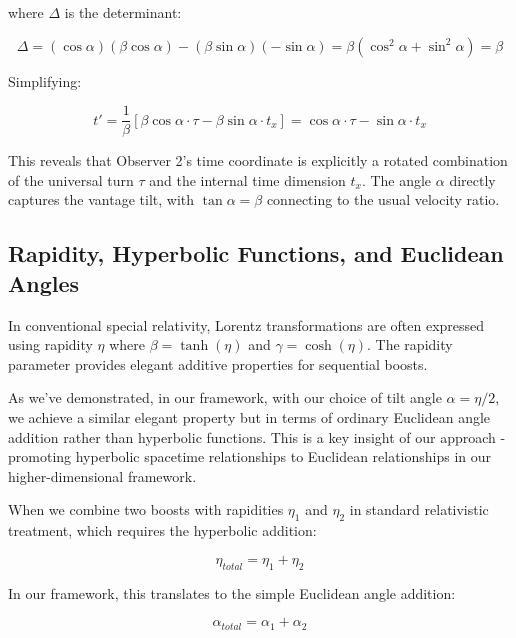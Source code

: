 \documentclass{article}
\begin{document}
where $\Delta$ is the determinant:

\begin{equation}
\Delta = (\cos\alpha)(\beta\cos\alpha) - (\beta\sin\alpha)(-\sin\alpha) = \beta(\cos^2\alpha + \sin^2\alpha) = \beta
\end{equation}

Simplifying:

\begin{equation}
t' = \frac{1}{\beta}[\beta\cos\alpha \cdot \tau - \beta\sin\alpha \cdot t_x] = \cos\alpha \cdot \tau - \sin\alpha \cdot t_x
\end{equation}

This reveals that Observer 2's time coordinate is explicitly a rotated combination of the universal turn $\tau$ and the internal time dimension $t_x$. The angle $\alpha$ directly captures the vantage tilt, with $\tan\alpha = \beta$ connecting to the usual velocity ratio.

\subsection{Rapidity, Hyperbolic Functions, and Euclidean Angles}

In conventional special relativity, Lorentz transformations are often expressed using rapidity $\eta$ where $\beta = \tanh(\eta)$ and $\gamma = \cosh(\eta)$. The rapidity parameter provides elegant additive properties for sequential boosts.

As we've demonstrated, in our framework, with our choice of tilt angle $\alpha = \eta/2$, we achieve a similar elegant property but in terms of ordinary Euclidean angle addition rather than hyperbolic functions. This is a key insight of our approach - promoting hyperbolic spacetime relationships to Euclidean relationships in our higher-dimensional framework.

When we combine two boosts with rapidities $\eta_1$ and $\eta_2$ in standard relativistic treatment, which requires the hyperbolic addition:

\begin{equation}
\eta_{total} = \eta_1 + \eta_2
\end{equation}

In our framework, this translates to the simple Euclidean angle addition:

\begin{equation}
\alpha_{total} = \alpha_1 + \alpha_2
\end{equation}
\end{document}
